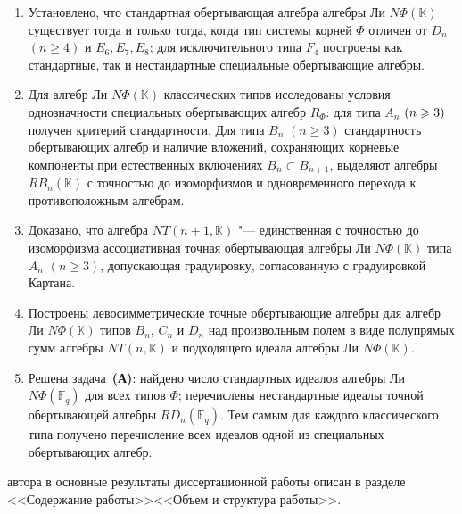 {\novelty}
\begin{enumerate}[beginpenalty=10000] %
    \item Установлено, что стандартная обертывающая алгебра алгебры Ли
          $N\Phi(\mathbb{K})$ существует тогда и только тогда, когда тип системы корней
          $\Phi$ отличен от $D_n$ $(n\geq4)$ и $E_6,E_7,E_8$; для исключительного типа
          $F_4$ построены как стандартные, так и нестандартные специальные обертывающие
          алгебры.
    \item Для алгебр Ли $N\Phi(\mathbb{K})$ классических типов исследованы условия
          однозначности специальных обертывающих алгебр $R_{\Phi}$: для типа $A_{n}$
          $(n\geq\nobreak3)$ получен критерий стандартности. Для типа $B_n$ $(n\geq3)$
          стандартность обертывающих алгебр и наличие вложений, сохраняющих корневые
          компоненты при естественных включениях $B_n\subset B_{n+1}$, выделяют алгебры
          $RB_n(\mathbb{K})$ с точностью до изоморфизмов и одновременного перехода к
          противоположным алгебрам.
    \item Доказано, что алгебра $NT(n+1,\mathbb{K})$ "--- единственная с точностью до
          изоморфизма ассоциативная точная обертывающая алгебры Ли $N\Phi(\mathbb{K})$
          типа $A_n$ $(n \geq 3)$, допускающая градуировку, согласованную с градуировкой
          Картана.
    \item Построены левосимметрические точные обертывающие алгебры для алгебр Ли
          $N\Phi(\mathbb{K})$ типов $B_n$, $C_n$ и $D_n$ над произвольным полем в виде
          полупрямых сумм алгебры $NT(n,\mathbb{K})$ и подходящего идеала алгебры Ли
          $N\Phi(\mathbb{K})$.
    \item Решена задача~\textbf{(А)}: найдено число стандартных идеалов алгебры Ли
          $N\Phi(\mathbb{F}_q)$ для всех типов $\Phi$; перечислены нестандартные идеалы
          точной обертывающей алгебры $RD_n(\mathbb{F}_q)$. Тем самым для каждого
          классического типа получено перечисление всех идеалов одной из специальных
          обертывающих алгебр.
\end{enumerate}

{\contribution} автора в основные результаты диссертационной работы описан в разделе
\ifsynopsis{}<<Содержание работы>>\else{}<<Объем и структура работы>>\fi.

